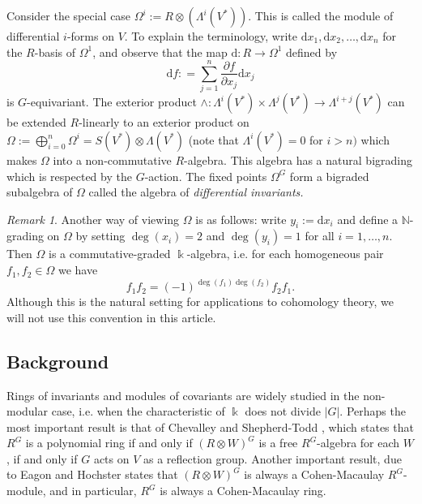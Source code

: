 \documentclass[a4paper]{amsart}
\newcommand{\kk}{\Bbbk}
\newcommand{\dd}{\mathrm{d}}
\def\N{\mathbb{N}}
\newtheorem*{Corollary of Conjecture}{Corollary of Conjecture}
\theoremstyle{definition}
\theoremstyle{remark}
\newtheorem{rem}[Lemma]{Remark}
\theoremstyle{Acknowledgments}
\begin{document}
Consider the special case $\Omega^i:= R \otimes (\Lambda^i(V^*))$. This is called the module of differential $i$-forms on $V$. To explain the terminology, write $\dd x_1,\dd x_2, \ldots, \dd x_n$ for the $R$-basis of $\Omega^1$, and observe that the map $\dd: R \rightarrow \Omega^1$ defined by
\begin{equation}\label{differential}
\dd f: = \sum_{j=1}^n \frac{\partial f}{\partial x_j} \dd x_j
\end{equation}
is $G$-equivariant. The exterior product $\wedge: \Lambda^i(V^*) \times \Lambda^{j}(V^*) \rightarrow \Lambda^{i+j}(V^*)$ can be extended $R$-linearly to an exterior product on $\Omega:= \bigoplus_{i=0}^n \Omega^i = S(V^*) \otimes \Lambda(V^*)$ (note that $\Lambda^i(V^*) = 0$ for $i>n)$ which makes $\Omega$ into a non-commutative $R$-algebra. This algebra has a natural bigrading which is respected by the $G$-action. The fixed points $\Omega^G$ form a bigraded subalgebra of $\Omega$ called the algebra of {\it differential invariants.} 

\begin{rem}
Another way of viewing $\Omega$ is as follows: write $y_i:= \dd x_i$ and define a $\N$-grading on $\Omega$ by setting $\deg(x_i)=2$ and $\deg(y_i)=1$ for all $i=1, \ldots, n$. Then $\Omega$ is a commutative-graded $\kk$-algebra, i.e. for each homogeneous pair $f_1, f_2 \in \Omega$ we have
\[f_1f_2 = (-1)^{\deg(f_1)\deg(f_2)}f_2f_1.\] Although this is the natural setting for applications to cohomology theory, we will not use this convention in this article.
\end{rem}

\subsection{Background}

Rings of invariants and modules of covariants are widely studied in the non-modular case, i.e. when  the characteristic of  $\kk$ does not divide $|G|$. Perhaps the most important result is that of Chevalley and Shepherd-Todd \cite{Chevalley}, which states that $R^G$ is a polynomial ring if and only if $(R \otimes W)^G$ is a free $R^G$-algebra for each $W$, if and only if $G$ acts on $V$ as a reflection group. Another important result, due to Eagon and Hochster \cite{EagonHochster} states that $(R \otimes W)^G$ is always a Cohen-Macaulay $R^G$-module, and in particular, $R^G$ is always a Cohen-Macaulay ring.
\end{document}
